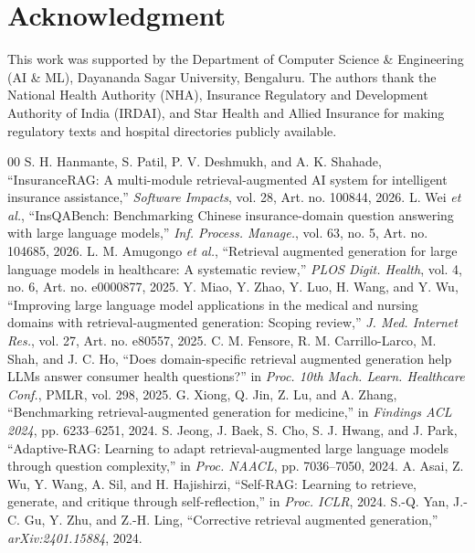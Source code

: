 \documentclass[conference]{IEEEtran}
\begin{document}
\section*{Acknowledgment}
This work was supported by the Department of Computer Science \& Engineering (AI \& ML), Dayananda Sagar University, Bengaluru. The authors thank the National Health Authority (NHA), Insurance Regulatory and Development Authority of India (IRDAI), and Star Health and Allied Insurance for making regulatory texts and hospital directories publicly available.

\begin{thebibliography}{00}
 S. H. Hanmante, S. Patil, P. V. Deshmukh, and A. K. Shahade, ``InsuranceRAG: A multi-module retrieval-augmented AI system for intelligent insurance assistance,'' \textit{Software Impacts}, vol. 28, Art. no. 100844, 2026.
 L. Wei \textit{et al.}, ``InsQABench: Benchmarking Chinese insurance-domain question answering with large language models,'' \textit{Inf. Process. Manage.}, vol. 63, no. 5, Art. no. 104685, 2026.
 L. M. Amugongo \textit{et al.}, ``Retrieval augmented generation for large language models in healthcare: A systematic review,'' \textit{PLOS Digit. Health}, vol. 4, no. 6, Art. no. e0000877, 2025.
 Y. Miao, Y. Zhao, Y. Luo, H. Wang, and Y. Wu, ``Improving large language model applications in the medical and nursing domains with retrieval-augmented generation: Scoping review,'' \textit{J. Med. Internet Res.}, vol. 27, Art. no. e80557, 2025.
 C. M. Fensore, R. M. Carrillo-Larco, M. Shah, and J. C. Ho, ``Does domain-specific retrieval augmented generation help LLMs answer consumer health questions?'' in \textit{Proc. 10th Mach. Learn. Healthcare Conf.}, PMLR, vol. 298, 2025.
 G. Xiong, Q. Jin, Z. Lu, and A. Zhang, ``Benchmarking retrieval-augmented generation for medicine,'' in \textit{Findings ACL 2024}, pp. 6233--6251, 2024.
 S. Jeong, J. Baek, S. Cho, S. J. Hwang, and J. Park, ``Adaptive-RAG: Learning to adapt retrieval-augmented large language models through question complexity,'' in \textit{Proc. NAACL}, pp. 7036--7050, 2024.
 A. Asai, Z. Wu, Y. Wang, A. Sil, and H. Hajishirzi, ``Self-RAG: Learning to retrieve, generate, and critique through self-reflection,'' in \textit{Proc. ICLR}, 2024.
 S.-Q. Yan, J.-C. Gu, Y. Zhu, and Z.-H. Ling, ``Corrective retrieval augmented generation,'' \textit{arXiv:2401.15884}, 2024.

\end{thebibliography}
\end{document}
